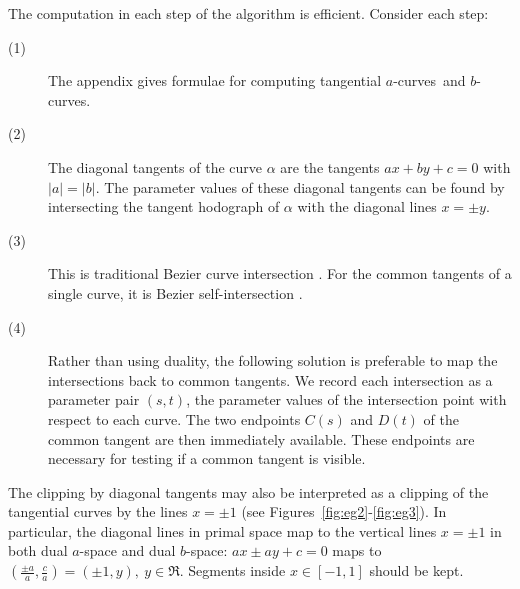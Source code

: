 \documentclass[9pt,twocolumn]{article}
\newif\ifJournal
\newcommand{\atangs}{tangential $a$-curves\ }
\begin{document}
The computation in each step of the algorithm is efficient.
Consider each step:
%
\begin{description}
\item[(1)] The appendix gives formulae for computing \atangs and $b$-curves.
\item[(2)] The diagonal tangents of the curve $\alpha$ are the 
	   tangents $ax+by+c=0$ with $|a|=|b|$.
	The parameter values of these diagonal tangents
	can be found by intersecting the tangent hodograph %
	of $\alpha$ with the diagonal lines $x=\pm y$.
\item[(3)] This is traditional Bezier curve intersection \cite{sederberg86}.
	For the common tangents of a single curve, it is Bezier self-intersection
	\cite{lasser89}.
\item[(4)] Rather than using duality, the following solution is preferable
	to map the intersections back to common tangents. 
	We record each intersection as a parameter pair $(s,t)$,
	the parameter values of the intersection point with respect to each curve.
	The two endpoints $C(s)$ and $D(t)$ of the common tangent are then immediately 
	available.
	These endpoints are necessary for testing if a common tangent is visible.
\end{description}

The clipping by diagonal tangents may also be interpreted
as a clipping of the tangential curves by the lines $x = \pm 1$
(see Figures~\ref{fig:eg2}-\ref{fig:eg3}).
In particular, the diagonal lines in primal space map to the vertical lines
$x = \pm 1$ in both dual $a$-space and dual $b$-space:
$ax \pm ay + c=0$ maps to $(\frac{\pm a}{a},\frac{c}{a}) = (\pm 1,y),\ y \in \Re$.
Segments inside $x \in [-1,1]$ should be kept.

\ifJournal
THIS IS THE FORMULA FOR C-CURVES (NOT A- or B-CURVES).
Note that if one wants to use duality
to map points of dual space to lines in primal space,
care must be taken to work in projective space.
If the intersection point is $C^*(t) = (c_1,c_2)$ and the weight function 
of the rational Bezier curve $C^*(t)$ at
this parameter value is $c_3$, the coordinates of the intersection
in projective dual space are $(c_3 c_1, c_3 c_2, c_3)$
and the associated line in primal space is $c_3 c_1 x + c_3 c_2 y + c_3 = 0$.
\fi
\end{document}
